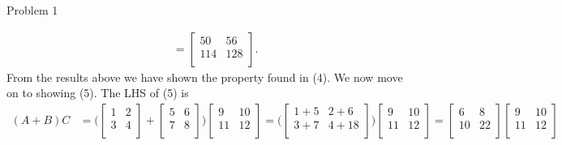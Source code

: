 \begin{problem}{Problem 1}
\begin{Highlight}[Solution]
\begin{align*}
            & =
            \begin{bmatrix}
                50 & 56 \\
                114 & 128 \\
            \end{bmatrix}.
        \end{align*}
        From the results above we have shown the property found in (4). We now move on to showing (5). The LHS of (5) is
        \begin{align*}
            (A + B)C & = 
            \Bigg(
                \begin{bmatrix}
                    1 & 2 \\
                    3 & 4 \\
                \end{bmatrix}
                + 
                \begin{bmatrix}
                    5 & 6 \\
                    7 & 8 \\
                \end{bmatrix}
            \Bigg)
            \begin{bmatrix}
                9 & 10 \\
                11 & 12 \\
            \end{bmatrix}
            =
            \Biggl(
                \begin{bmatrix}
                    1 + 5 & 2 + 6 \\
                    3 + 7 & 4 + 18 \\
                \end{bmatrix}
            \Biggr)
            \begin{bmatrix}
                9 & 10 \\
                11 & 12 \\
            \end{bmatrix}
            = 
            \begin{bmatrix}
                6 & 8 \\
                10 & 22 \\
            \end{bmatrix}
            \begin{bmatrix}
                9 & 10 \\
                11 & 12 \\
            \end{bmatrix} \\

\end{align*}
\end{Highlight}
\end{problem}
